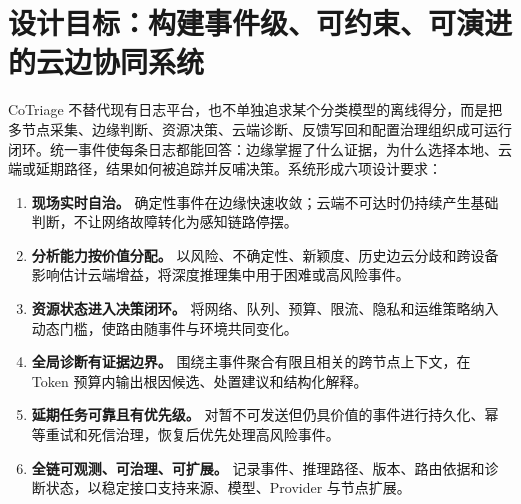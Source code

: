 \section{设计目标：构建事件级、可约束、可演进的云边协同系统}

CoTriage 不替代现有日志平台，也不单独追求某个分类模型的离线得分，而是把多节点采集、边缘判断、资源决策、云端诊断、反馈写回和配置治理组织成可运行闭环。统一事件使每条日志都能回答：边缘掌握了什么证据，为什么选择本地、云端或延期路径，结果如何被追踪并反哺决策。系统形成六项设计要求：

{\small
\begin{enumerate}[leftmargin=*,itemsep=1pt,topsep=3pt,parsep=0pt]
  \item \textbf{现场实时自治。} 确定性事件在边缘快速收敛；云端不可达时仍持续产生基础判断，不让网络故障转化为感知链路停摆。
  \item \textbf{分析能力按价值分配。} 以风险、不确定性、新颖度、历史边云分歧和跨设备影响估计云端增益，将深度推理集中用于困难或高风险事件。
  \item \textbf{资源状态进入决策闭环。} 将网络、队列、预算、限流、隐私和运维策略纳入动态门槛，使路由随事件与环境共同变化。
  \item \textbf{全局诊断有证据边界。} 围绕主事件聚合有限且相关的跨节点上下文，在 Token 预算内输出根因候选、处置建议和结构化解释。
  \item \textbf{延期任务可靠且有优先级。} 对暂不可发送但仍具价值的事件进行持久化、幂等重试和死信治理，恢复后优先处理高风险事件。
  \item \textbf{全链可观测、可治理、可扩展。} 记录事件、推理路径、版本、路由依据和诊断状态，以稳定接口支持来源、模型、Provider 与节点扩展。
\end{enumerate}
}
